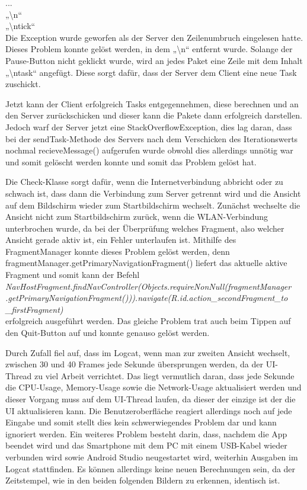 \documentclass[12pt, onecolumn,notitlepage]{scrartcl}
\begin{document}
... \\
„\textbackslash n“ \\
„\textbackslash ntick“ \\
Die Exception wurde geworfen als der Server den Zeilenumbruch eingelesen hatte. Dieses Problem konnte gelöst werden, in dem „\textbackslash n“ entfernt wurde. Solange der Pause-Button nicht geklickt wurde, wird an jedes Paket eine Zeile mit dem Inhalt „\textbackslash ntask“ angefügt. Diese sorgt dafür, dass der Server dem Client eine neue Task zuschickt. \par
Jetzt kann der Client erfolgreich Tasks entgegennehmen, diese berechnen und an den Server zurückschicken und dieser kann die Pakete dann erfolgreich darstellen. Jedoch warf der Server jetzt eine StackOverflowException, dies lag daran, dass bei der sendTask-Methode des Servers nach dem Verschicken des Iterationswerts nochmal recieveMessage() aufgerufen wurde obwohl dies allerdings unnötig war und somit gelöscht werden konnte und somit das Problem gelöst hat. \par
Die Check-Klasse sorgt dafür, wenn die Internetverbindung abbricht oder zu schwach ist, dass dann die Verbindung zum Server getrennt wird und die Ansicht auf dem Bildschirm wieder zum Startbildschirm wechselt. Zunächst wechselte die Ansicht nicht zum Startbildschirm zurück, wenn die WLAN-Verbindung unterbrochen wurde, da bei der Überprüfung welches Fragment, also welcher Ansicht gerade aktiv ist, ein Fehler unterlaufen ist. Mithilfe des FragmentManager konnte dieses Problem gelöst werden, denn fragmentManager.getPrimaryNavigationFragment() liefert das aktuelle aktive Fragment und somit kann der Befehl \\
\textit{NavHostFragment.findNavController(Objects.requireNonNull(fragmentManager\\.getPrimaryNavigationFragment())).navigate(R.id.action\_secondFragment\_to\\\_firstFragment)} \\
erfolgreich ausgeführt werden. Das gleiche Problem trat auch beim Tippen auf den Quit-Button auf und konnte genauso gelöst werden. \par
Durch Zufall fiel auf, dass im Logcat, wenn man zur zweiten Ansicht wechselt, zwischen 30 und 40 Frames jede Sekunde übersprungen werden, da der UI-Thread zu viel Arbeit verrichtet. Das liegt vermutlich daran, dass jede Sekunde die CPU-Usage, Memory-Usage sowie die Network-Usage aktualisiert werden und dieser Vorgang muss auf dem UI-Thread laufen, da dieser der einzige ist der die UI aktualisieren kann. Die Benutzeroberfläche reagiert allerdings noch auf jede Eingabe und somit stellt dies kein schwerwiegendes Problem dar und kann ignoriert werden.
Ein weiteres Problem besteht darin, dass, nachdem die App beendet wird und das Smartphone mit dem PC mit einem USB-Kabel wieder verbunden wird sowie Android Studio neugestartet wird, weiterhin Ausgaben im Logcat stattfinden. Es können allerdings keine neuen Berechnungen sein, da der Zeitstempel, wie in den beiden folgenden Bildern zu erkennen, identisch ist.
\end{document}
